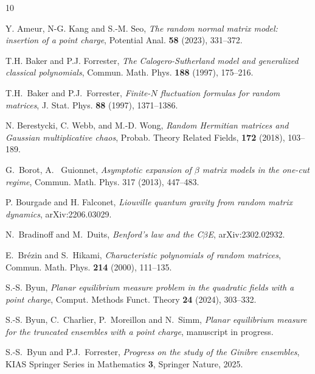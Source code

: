 \documentclass[11pt,a4paper]{article}
\numberwithin{equation}{section} %
\theoremstyle{plain}
\theoremstyle{definition}
\numberwithin{prop}{section}
\numberwithin{cor}{section}
\numberwithin{remark}{section}
\begin{document}
\small
\providecommand{\bysame}{\leavevmode\hbox to3em{\hrulefill}\thinspace}
\providecommand{\MR}{\relax\ifhmode\unskip\space\fi MR }
\providecommand{\MRhref}[2]{%
  \href{http://www.ams.org/mathscinet-getitem?mr=#1}{#2}
}
\providecommand{\href}[2]{#2}
\begin{thebibliography}{10}

Y. Ameur, N-G. Kang and S.-M. Seo,
\emph{The random normal matrix model: insertion of a point charge},
Potential Anal. \textbf{58}
(2023), 331--372.

T.H. Baker and P.J. Forrester, \emph{The {Calogero-Sutherland} model and
  generalized classical polynomials}, Commun. Math. Phys. \textbf{188} (1997),
  175--216.
  
T.H.~Baker and P.J.~Forrester, \emph{Finite-$N$ fluctuation formulas for random matrices}, J. Stat.
  Phys. \textbf{88} (1997), 1371--1386. 
  
  N. Berestycki, C. Webb, and M.-D. Wong, \emph{Random Hermitian matrices and Gaussian
multiplicative chaos}, Probab. Theory Related Fields, \textbf{172} (2018), 103--189.

G.~Borot, A.~ Guionnet,  \emph{Asymptotic expansion of $\beta$ matrix models in
  the one-cut regime}, Commun. Math. Phys. 317 (2013), 447--483.

  
  
  P. Bourgade and H. Falconet, \emph{Liouville quantum gravity from random matrix dynamics}, arXiv:2206.03029.
  
  
  
  N.~Bradinoff and M.~Duits, \emph{Benford's law and the C$\beta$E}, arXiv:2302.02932.
  
  
E.~Br\'ezin and S.~Hikami, \emph{Characteristic polynomials of random matrices}, Commun. Math.
  Phys. \textbf{214} (2000), 111--135.

   S.-S. Byun, \emph{Planar equilibrium measure problem in the quadratic fields with a point charge}, Comput. Methods Funct. Theory \textbf{24} (2024), 303--332.


S.-S. Byun, C.~Charlier, P.~Moreillon and N.~Simm, \emph{Planar equilibrium measure for the truncated ensembles with a point charge}, manuscript in progress.
  

   S.-S.~Byun and P.J.~Forrester,   \emph{Progress on the study of the Ginibre ensembles},
  KIAS Springer Series in Mathematics \textbf{3}, Springer Nature, 2025.


\end{thebibliography}
\end{document}

